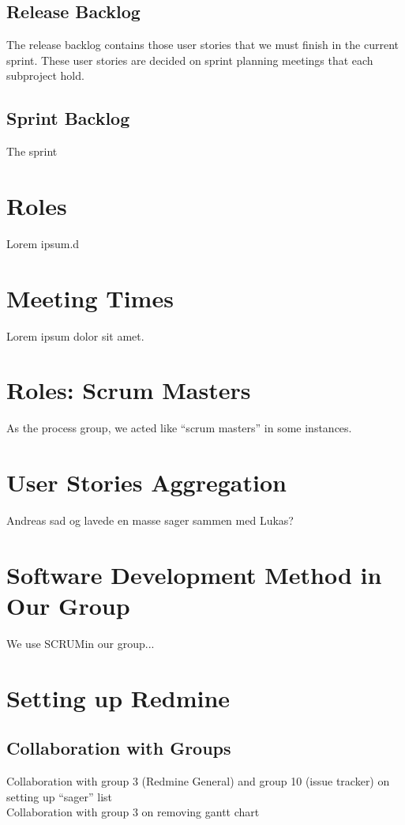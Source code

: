 \subsection{Release Backlog}
The release backlog contains those user stories that we must finish in the current sprint. These user stories are decided on sprint planning meetings that each subproject hold.

\subsection{Sprint Backlog}
The sprint 

\section{Roles}
Lorem ipsum.d

\section{Meeting Times}
Lorem ipsum dolor sit amet.

\section{Roles: Scrum Masters}
As the process group, we acted like ``scrum masters'' in some instances.

\section{User Stories Aggregation}
Andreas sad og lavede en masse sager sammen med Lukas?

\section{Software Development Method in Our Group}
We use SCRUM\@ in our group...

\section{Setting up Redmine}
\subsection{Collaboration with Groups}
Collaboration with group 3 (Redmine General) and group 10 (issue tracker) on setting up ``sager'' list\\
Collaboration with group 3 on removing gantt chart